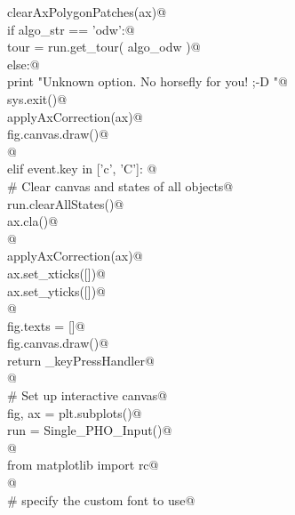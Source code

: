 \documentclass[10.0pt]{report}
\begin{document}
\begin{flushleft}
\begin{list}{}{}
\mbox{}\verb@                    clearAxPolygonPatches(ax)@\\
\mbox{}\verb@                    if   algo_str == 'odw':@\\
\mbox{}\verb@                          tour = run.get_tour( algo_odw )@\\
\mbox{}\verb@                    else:@\\
\mbox{}\verb@                          print "Unknown option. No horsefly for you! ;-D "@\\
\mbox{}\verb@                          sys.exit()@\\
\mbox{}\verb@                    applyAxCorrection(ax)@\\
\mbox{}\verb@                    fig.canvas.draw()@\\
\mbox{}\verb@                    @\\
\mbox{}\verb@               elif event.key in ['c', 'C']: @\\
\mbox{}\verb@                    # Clear canvas and states of all objects@\\
\mbox{}\verb@                    run.clearAllStates()@\\
\mbox{}\verb@                    ax.cla()@\\
\mbox{}\verb@                                  @\\
\mbox{}\verb@                    applyAxCorrection(ax)@\\
\mbox{}\verb@                    ax.set_xticks([])@\\
\mbox{}\verb@                    ax.set_yticks([])@\\
\mbox{}\verb@                                     @\\
\mbox{}\verb@                    fig.texts = []@\\
\mbox{}\verb@                    fig.canvas.draw()@\\
\mbox{}\verb@           return _keyPressHandler@\\
\mbox{}\verb@    @\\
\mbox{}\verb@    # Set up interactive canvas@\\
\mbox{}\verb@    fig, ax =  plt.subplots()@\\
\mbox{}\verb@    run = Single_PHO_Input()@\\
\mbox{}\verb@        @\\
\mbox{}\verb@    from matplotlib import rc@\\
\mbox{}\verb@    @\\
\mbox{}\verb@    # specify the custom font to use@\\

\end{list}
\end{flushleft}
\end{document}
